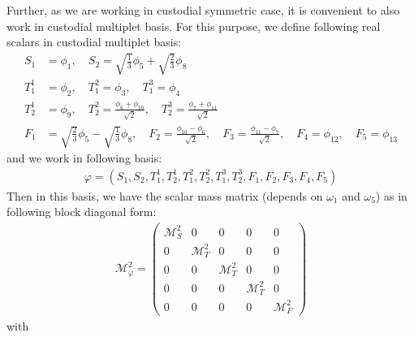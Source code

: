 \documentclass[12pt]{article}
\begin{document}
Further, as we are working in custodial symmetric case, it is convenient to also work in custodial multiplet basis. For this purpose, we define following real scalars in custodial multiplet basis:
\begin{subequations}
    \begin{align}
        S_1 &= \phi_1, \quad  S_2 = \sqrt{\frac{1}{3}}\phi_5 + \sqrt{\frac{2}{3}}\phi_8\\
        T_1^1 &= \phi_2 ,\quad T_1^2 = \phi_3, \quad T_1^3 = \phi_4 \\
        T_2^1 &= \phi_9,\quad  T_2^2 = \frac{\phi_6 + \phi_{10}}{\sqrt{2}},\quad T_2^3 = \frac{\phi_7 + \phi_{11}}{\sqrt{2}} \\
        F_1 &= \sqrt{\frac{2}{3}}\phi_5 - \sqrt{\frac{1}{3}}\phi_8,\quad
        F_2 = \frac{\phi_{10} - \phi_6}{\sqrt{2}},\quad
        F_3 = \frac{\phi_{11} - \phi_7}{\sqrt{2}},\quad
        F_4 = \phi_{12},\quad
        F_5 = \phi_{13}
    \end{align}
\end{subequations}
and we work in following basis:
\begin{align}
    \varphi = (S_1,S_2,T_1^1,T_2^1, T_1^2, T_2^2, T_1^3, T_2^3, F_1,F_2,F_3,F_4,F_5)
\end{align}
Then in this basis, we have the scalar mass matrix (depends on $\omega_1$ and $\omega_5$) as in following block diagonal form:
\begin{align}
    \label{equ:field_dependent_mass_matrix}
    \mathcal{M}_\varphi^2 = \begin{pmatrix}
        \mathcal{M}_S^2 & 0 & 0 & 0 & 0 \\
        0 & \mathcal{M}_T^2 & 0 & 0 & 0 \\
        0 & 0 & \mathcal{M}_T^2 & 0 & 0 \\
        0 & 0 & 0 & \mathcal{M}_T^2 & 0 \\
        0 & 0 & 0 & 0 & \mathcal{M}_F^2
    \end{pmatrix}
\end{align}
with
\end{document}
